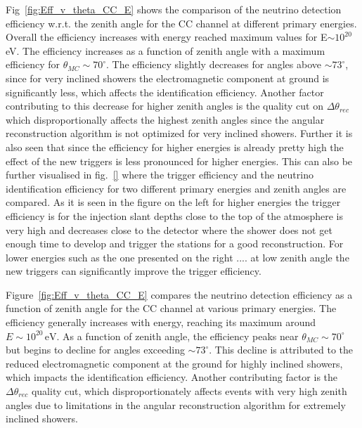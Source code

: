 
Fig~\ref{fig:Eff_v_theta_CC_E} shows the comparison of the neutrino detection efficiency w.r.t. the zenith angle for the CC channel at different primary energies. Overall the efficiency increases with energy reached maximum values for E$\sim 10^{20}$eV. The efficiency increases as a function of zenith angle with a maximum efficiency for $\theta_{MC} \sim 70^{\circ}$. The efficiency slightly decreases for angles above $ \sim 73^{\circ}$, since for very inclined showers the electromagnetic component at ground is significantly less, which affects the identification efficiency. Another factor contributing to this decrease for higher zenith angles is the quality cut on $\Delta \theta_{rec}$ which disproportionally affects the highest zenith angles since the angular reconstruction algorithm is not optimized for very inclined showers. Further it is also seen that since the efficiency for higher energies is already pretty high the effect of the new triggers is less pronounced for higher energies. This can also be further visualised in fig.~\ref{} where the trigger efficiency and the neutrino identification efficiency for two different primary energies and zenith angles are compared. As it is seen in the figure on the left for higher energies the trigger efficiency is for the injection slant depths close to the top of the atmosphere is very high and decreases close to the detector where the shower does not get enough time to develop and trigger the stations for a good reconstruction. For lower energies  such as the one presented on the right .... at low zenith angle the new triggers can significantly improve the trigger efficiency. 

Figure~\ref{fig:Eff_v_theta_CC_E} compares the neutrino detection efficiency as a function of zenith angle for the CC channel at various primary energies. The efficiency generally increases with energy, reaching its maximum around \(E \sim 10^{20}\,\mathrm{eV}\). As a function of zenith angle, the efficiency peaks near \(\theta_{MC} \sim 70^\circ\) but begins to decline for angles exceeding \(\sim 73^\circ\). This decline is attributed to the reduced electromagnetic component at the ground for highly inclined showers, which impacts the identification efficiency. Another contributing factor is the \(\Delta \theta_{rec}\) quality cut, which disproportionately affects events with very high zenith angles due to limitations in the angular reconstruction algorithm for extremely inclined showers.

